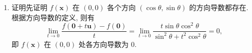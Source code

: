 % 
\begin{enumerate}
    \item %
        {\heiti 证明}\quad 先证明 $f(\boldsymbol{x})$ 在 $(0, 0)$ 各个方向 $(\cos\theta, \sin\theta)$ 的方向导数都存在. 根据方向导数的定义, 则有
        \[
            \lim_{t \to 0}\frac{f(\boldsymbol{0} + t\boldsymbol{u}) - f(\boldsymbol{0})}{t} = \lim_{t\to 0}\frac{t\sin\theta\cos^2\theta}{\sin^2\theta + t^2\cos^2\theta} = 0,    
        \]
        即 $f(\boldsymbol{x})$ 在 $(0, 0)$ 处各方向导数为 0.


\end{enumerate}
